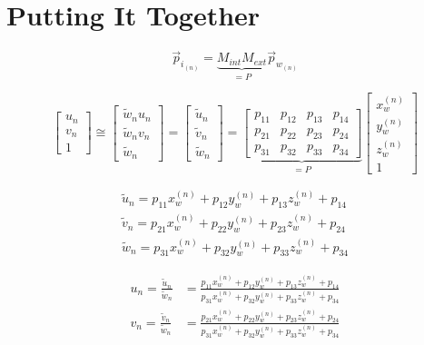 \section{Putting It Together}
\begin{equation}
    \vec{p}_{i_{(n)}} = \underbrace{M_{int}M_{ext}}_{=P}\vec{p}_{w_{(n)}}
\end{equation}

\begin{equation}
    \begin{bmatrix}
        u_n \\ v_n \\ 1
    \end{bmatrix}
    \cong
    \begin{bmatrix}
        \widetilde{w}_n u_n \\ \widetilde{w}_n v_n \\ \widetilde{w}_n
    \end{bmatrix}
    =
    \begin{bmatrix}
        \widetilde{u}_n \\ \widetilde{v}_n \\ \widetilde{w}_n
    \end{bmatrix}
    =
    \underbrace{
        \begin{bmatrix}
            p_{11} & p_{12} & p_{13} & p_{14} \\
            p_{21} & p_{22} & p_{23} & p_{24} \\
            p_{31} & p_{32} & p_{33} & p_{34}
        \end{bmatrix}
    }_{=P}
    \begin{bmatrix}
        x_w^{(n)} \\ y_w^{(n)} \\ z_w^{(n)} \\ 1
    \end{bmatrix}
\end{equation}

\begin{align}
        \widetilde{u}_n = p_{11}x_w^{(n)} + p_{12}y_w^{(n)} + p_{13}z_w^{(n)} + p_{14} \\
        \widetilde{v}_n = p_{21}x_w^{(n)} + p_{22}y_w^{(n)} + p_{23}z_w^{(n)} + p_{24} \\
        \widetilde{w}_n = p_{31}x_w^{(n)} + p_{32}y_w^{(n)} + p_{33}z_w^{(n)} + p_{34}
\end{align}


\begin{align}
    u_n = \frac{\widetilde{u}_n}{\widetilde{w}_n} & = \frac{p_{11}x_w^{(n)} + p_{12}y_w^{(n)} + p_{13}z_w^{(n)} + p_{14}}{p_{31}x_w^{(n)} + p_{32}y_w^{(n)} + p_{33}z_w^{(n)} + p_{34}} \\
    v_n = \frac{\widetilde{v}_n}{\widetilde{w}_n} & = \frac{p_{21}x_w^{(n)} + p_{22}y_w^{(n)} + p_{23}z_w^{(n)} + p_{24}}{p_{31}x_w^{(n)} + p_{32}y_w^{(n)} + p_{33}z_w^{(n)} + p_{34}}
\end{align}

